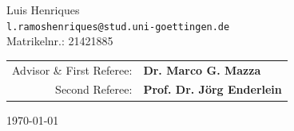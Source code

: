 \begin{titlepage}

\Large{Luis Henriques} \\
{\small \texttt{l.ramoshenriques@stud.uni-goettingen.de}} \\
{\small Matrikelnr.: 21421885}
\vspace{2.0cm}

\fontsize{11pt}{11pt}\selectfont

\begin{center}
\begin{tabular}{rl}
Advisor \& First Referee: & \textbf{Dr. Marco G. Mazza}\\[2pt]
Second Referee: & \textbf{Prof. Dr. Jörg Enderlein}\\

\end{tabular}
\end{center} 


{\large \today}
\vspace*{\fill}



\end{titlepage}

